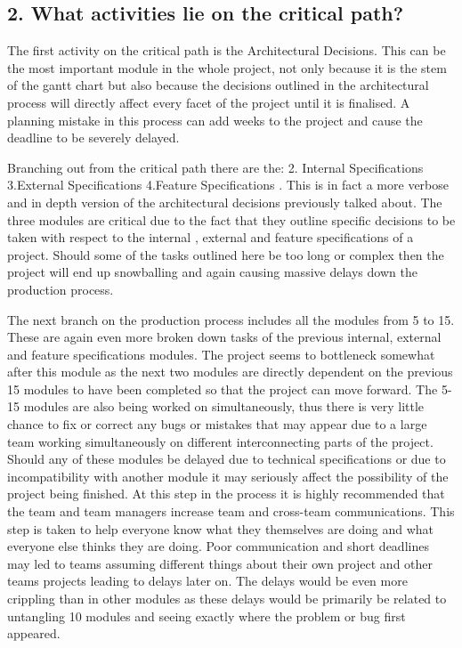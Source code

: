 \documentclass{article}
\begin{document}
\pagebreak


\subsection{2. What activities lie on the critical path?}


 
The first activity on the critical path is the Architectural Decisions. This can be the most important module in the whole project, not only because it is the stem of the gantt chart but also because the decisions outlined in the architectural process will directly affect every facet of the project until it is finalised. A planning mistake in this process can add weeks to the project and cause the deadline to be severely delayed.


Branching out from the critical path there are the: 2. Internal Specifications 3.External Specifications 4.Feature Specifications . This is in fact a more verbose and in depth version of the architectural decisions previously talked about. The three modules are critical due to the fact that they outline specific decisions to be taken with respect to the internal , external and feature specifications of a project. Should some of the tasks outlined here be  too long or complex then the project will end up snowballing and again causing massive delays down the production process.


The next branch on the production process includes all the modules from 5 to 15. These are again even more broken down tasks of the previous internal, external and feature specifications modules. The project seems to bottleneck somewhat after this module as the next two modules are directly dependent on the previous 15 modules to have been completed so that the project can move forward. The 5-15 modules are also being worked on simultaneously, thus there is very little chance to fix or correct any bugs or mistakes that may appear due to a large team working simultaneously on different interconnecting parts of the project. Should any of these modules be delayed due to technical specifications or due to incompatibility with another module it may seriously affect the possibility of the project being finished. At this step in the process it is highly recommended that the team and team managers increase team and cross-team communications. This step is taken to help everyone know what they themselves are doing and what everyone else thinks they are doing. Poor communication and short deadlines may led to teams assuming different things about their own project and other teams projects leading to delays later on. The delays would be even more crippling than in other modules as these delays would be primarily be related to untangling 10 modules and seeing exactly where the problem or bug first appeared.
\end{document}
